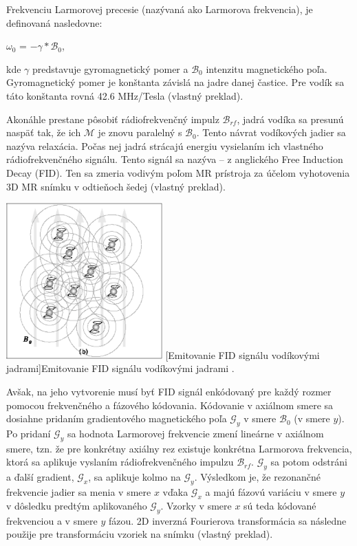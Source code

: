 Frekvenciu Larmorovej precesie (nazývaná ako Larmorova frekvencia), je definovaná nasledovne:

\begin {center}
$\omega_{0}$ = $-\gamma * \mathcal{B}_{0}$,
\end {center}

kde $\gamma$ predstavuje gyromagnetický pomer a $\mathcal{B}_{0}$ intenzitu magnetického poľa.
Gyromagnetický pomer je konštanta závislá na jadre danej častice. Pre vodík sa táto konštanta rovná 42.6 MHz/Tesla \cite{basic_principles_of_mri} (vlastný preklad). \newline

Akonáhle prestane pôsobiť rádiofrekvenčný impulz $\mathcal{B}_{rf}$, jadrá vodíka sa presunú naspäť tak, že ich $\mathcal{M}$ je znovu paralelný s $\mathcal{B}_{0}$. Tento návrat vodíkových jadier sa nazýva relaxácia. Počas nej jadrá strácajú energiu vysielaním ich vlastného rádiofrekvenčného signálu. Tento signál sa nazýva  -- z anglického Free Induction Decay (FID). Ten sa zmeria vodivým poľom MR prístroja za účelom vyhotovenia 3D MR snímku v odtieňoch šedej \cite{basic_principles_of_mri} (vlastný preklad).

\begin {center}
        \centering
        \includegraphics[width=6cm, height=6cm]{media/hydrogen/hydrogen_emitting_rf.png}
        [Emitovanie FID signálu vodíkovými jadrami]{Emitovanie FID signálu vodíkovými jadrami \cite{basic_principles_of_mri}.}
\end {center}

Avšak, na jeho vytvorenie musí byť FID signál enkódovaný pre každý rozmer pomocou frekvenčného a fázového kódovania. Kódovanie v axiálnom smere sa dosiahne pridaním gradientového magnetického poľa $\mathcal{G}_{y}$ v smere $\mathcal{B}_{0}$ (v smere $y$). Po pridaní $\mathcal{G}_{y}$ sa hodnota Larmorovej frekvencie zmení lineárne v axiálnom smere, tzn. že pre konkrétny axiálny rez existuje konkrétna Larmorova frekvencia, ktorá sa aplikuje vyslaním rádiofrekvenčného impulzu $\mathcal{B}_{rf}$. $\mathcal{G}_{y}$ sa potom odstráni a ďalší gradient, $\mathcal{G}_{x}$, sa aplikuje kolmo na $\mathcal{G}_{y}$. Výsledkom je, že rezonančné frekvencie jadier sa menia v smere $x$ vďaka $\mathcal{G}_{x}$ a majú fázovú variáciu v smere $y$ v dôsledku predtým aplikovaného $\mathcal{G}_{y}$. Vzorky v smere $x$ sú teda kódované frekvenciou a v smere $y$ fázou. 2D inverzná Fourierova transformácia sa následne použije pre transformáciu vzoriek na snímku \cite{basic_principles_of_mri} (vlastný preklad). \newline

